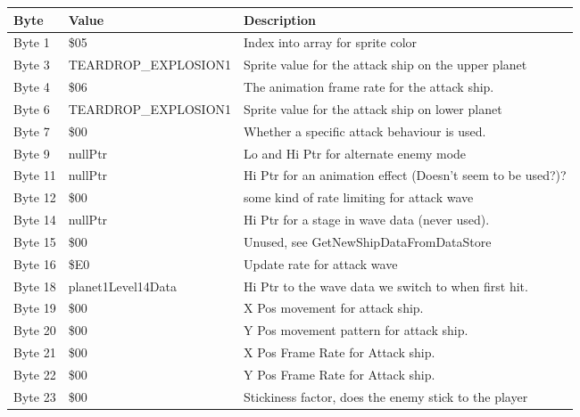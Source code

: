 \begin{figure}[H]
{\begin{adjustbox}{width=12cm}
\begin{tabular}{lll}
\toprule
 Byte    & Value               & Description                                                        \\
\midrule
 Byte 1  & \$05                 & Index into array for sprite color                                  \\
 Byte 3  & TEARDROP\_EXPLOSION1 & Sprite value for the attack ship on the upper planet               \\
 Byte 4  & \$06                 & The animation frame rate for the attack ship.                      \\
 Byte 6  & TEARDROP\_EXPLOSION1 & Sprite value for the attack ship on lower planet                   \\
 Byte 7  & \$00                 & Whether a specific attack behaviour is used.                       \\
 Byte 9  & nullPtr             & Lo and Hi Ptr for alternate enemy mode                             \\
 Byte 11 & nullPtr             & Hi Ptr for an animation effect (Doesn't seem to be used?)?         \\
 Byte 12 & \$00                 & some kind of rate limiting for attack wave                         \\
 Byte 14 & nullPtr             & Hi Ptr for a stage in wave data (never used).                      \\
 Byte 15 & \$00                 & Unused, see GetNewShipDataFromDataStore                            \\
 Byte 16 & \$E0                 & Update rate for attack wave                                        \\
 Byte 18 & planet1Level14Data  & Hi Ptr to the wave data we switch to when first hit.               \\
 Byte 19 & \$00                 & X Pos movement for attack ship.                                    \\
 Byte 20 & \$00                 & Y Pos movement pattern for attack ship.                            \\
 Byte 21 & \$00                 & X Pos Frame Rate for Attack ship.                                  \\
 Byte 22 & \$00                 & Y Pos Frame Rate for Attack ship.                                  \\
 Byte 23 & \$00                 & Stickiness factor, does the enemy stick to the player              \\

\end{tabular}
\end{adjustbox}}
\end{figure}
